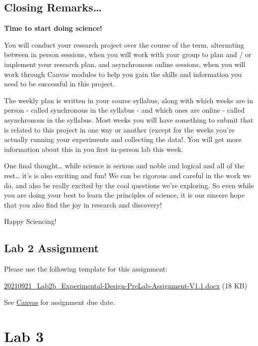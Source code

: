 \documentclass[
]{book}
\begin{document}
\hypertarget{closing-remarks}{%
\chapter*{Closing Remarks\ldots{}}\label{closing-remarks}}

\textbf{Time to start doing science!}

You will conduct your research project over the course of the term, alternating between in person sessions, when you will work with your group to plan and / or implement your research plan, and asynchronous online sessions, when you will work through Canvas modules to help you gain the skills and information you need to be successful in this project.

The weekly plan is written in your course syllabus, along with which weeks are in person - called synchronous in the syllabus - and which ones are online - called asynchronous in the syllabus. Most weeks you will have something to submit that is related to this project in one way or another (except for the weeks you're actually running your experiments and collecting the data!. You will get more information about this in you first in-person lab this week.

One final thought\ldots{} while science is serious and noble and logical and all of the rest\ldots{} it's is also exciting and fun! We can be rigorous and careful in the work we do, and also be really excited by the cool questions we're exploring. So even while you are doing your best to learn the principles of science, it is our sincere hope that you also find the joy in research and discovery!

Happy Sciencing!

\hypertarget{lab-2-assignment}{%
\chapter*{Lab 2 Assignment}\label{lab-2-assignment}}

Please use the following template for this assignment:

\href{files/20210921_Lab2b_Experimental-Design-PreLab-Assignment-V1.1.docx}{20210921\_Lab2b\_Experimental-Design-PreLab-Assignment-V1.1.docx} (18 KB)

See \href{https://canvas.ubc.ca}{Canvas} for assignment due date.

\hypertarget{part-lab-3}{%
\part*{Lab 3}\label{part-lab-3}}
\end{document}
